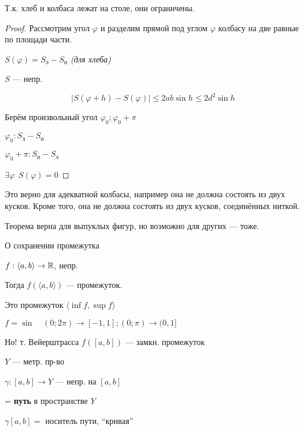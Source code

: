     \begin{remark}
        Т.к. хлеб и колбаса лежат на столе, они ограничены.
    \end{remark}
    \begin{proof}
        Рассмотрим угол $\varphi$ и разделим прямой под углом $\varphi$ колбасу на две равные по площади части.

        $S(\varphi) = S_{\text{л}}-S_{\text{п}}$ \textit{(для хлеба)}

        $S$ --- непр.

        $$|S(\varphi+h)-S(\varphi)|\leq 2ab\sin h\leq 2d^2\sin h$$

        Берём произвольный угол $\varphi_0; \varphi_0+\pi$

        $\varphi_0: S_{\text{л}} - S_{\text{п}}$

        $\varphi_0+\pi: S_{\text{п}} - S_{\text{л}}$

        $\exists \varphi \ \ S(\varphi)=0$
    \end{proof}
    \begin{remark}
        Это верно для адекватной колбасы, например она не должна состоять из двух кусков. Кроме того, она не должна состоять из двух кусков, соединённых ниткой.

        Теорема верна для выпуклых фигур, но возможно для других --- тоже.
    \end{remark}
    \begin{theorem}
        О сохранении промежутка
        
        $f:\langle a,b \rangle \to\operatorname*{\mathbb{R}}$, непр.

        Тогда $f(\langle a,b \rangle)$ --- промежуток.
    \end{theorem}
    \begin{remark}
        Это промежуток $\langle \inf f, \sup f \rangle$
    \end{remark}
    \begin{remark}
        $f=\sin \quad (0; 2\pi)\to [-1, 1]; (0; \pi)\to (0, 1]$

        Но! т. Вейерштрасса $f([a,b])$ --- замкн. промежуток
    \end{remark}
    \begin{definition}
        $Y$ --- метр. пр-во
        
        $\gamma: [a,b]\to Y$ --- непр. на $[a,b]$

        = \textbf{путь} в пространстве $Y$

        $\gamma[a,b] = $ носитель пути, ``кривая''
    \end{definition}
